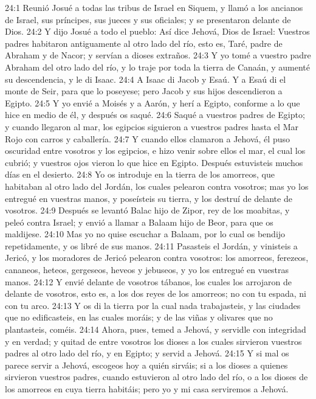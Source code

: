 24:1 Reunió Josué a todas las tribus de Israel en Siquem, y llamó a los ancianos de Israel, sus príncipes, sus jueces y sus oficiales; y se presentaron delante de Dios.  
24:2 Y dijo Josué a todo el pueblo: Así dice Jehová, Dios de Israel: Vuestros padres habitaron antiguamente al otro lado del río, esto es, Taré, padre de Abraham y de Nacor; y servían a dioses extraños.  
24:3 Y yo tomé a vuestro padre Abraham del otro lado del río, y lo traje por toda la tierra de Canaán, y aumenté su descendencia, y le di Isaac. 
24:4 A Isaac di Jacob y Esaú. Y a Esaú di el monte de Seir, para que lo poseyese; pero Jacob y sus hijos descendieron a Egipto. 
24:5 Y yo envié a Moisés y a Aarón, y herí a Egipto, conforme a lo que hice en medio de él, y después os saqué.  
24:6 Saqué a vuestros padres de Egipto; y cuando llegaron al mar, los egipcios siguieron a vuestros padres hasta el Mar Rojo con carros y caballería.  
24:7 Y cuando ellos clamaron a Jehová, él puso oscuridad entre vosotros y los egipcios, e hizo venir sobre ellos el mar, el cual los cubrió; y vuestros ojos vieron lo que hice en Egipto. Después estuvisteis muchos días en el desierto.  
24:8 Yo os introduje en la tierra de los amorreos, que habitaban al otro lado del Jordán, los cuales pelearon contra vosotros; mas yo los entregué en vuestras manos, y poseísteis su tierra, y los destruí de delante de vosotros. 
24:9 Después se levantó Balac hijo de Zipor, rey de los moabitas, y peleó contra Israel; y envió a llamar a Balaam hijo de Beor, para que os maldijese.  
24:10 Mas yo no quise escuchar a Balaam, por lo cual os bendijo repetidamente, y os libré de sus manos.  
24:11 Pasasteis el Jordán, y vinisteis a Jericó, y los moradores de Jericó pelearon contra vosotros: los amorreos, ferezeos, cananeos, heteos, gergeseos, heveos y jebuseos, y yo los entregué en vuestras manos.  
24:12 Y envié delante de vosotros tábanos, los cuales los arrojaron de delante de vosotros, esto es, a los dos reyes de los amorreos; no con tu espada, ni con tu arco.  
24:13 Y os di la tierra por la cual nada trabajasteis, y las ciudades que no edificasteis, en las cuales moráis; y de las viñas y olivares que no plantasteis, coméis. 
24:14 Ahora, pues, temed a Jehová, y servidle con integridad y en verdad; y quitad de entre vosotros los dioses a los cuales sirvieron vuestros padres al otro lado del río, y en Egipto; y servid a Jehová.  
24:15 Y si mal os parece servir a Jehová, escogeos hoy a quién sirváis; si a los dioses a quienes sirvieron vuestros padres, cuando estuvieron al otro lado del río, o a los dioses de los amorreos en cuya tierra habitáis; pero yo y mi casa serviremos a Jehová.  
